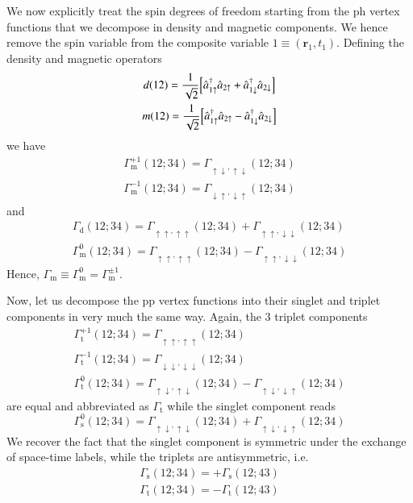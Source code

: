 \documentclass[aip,jcp,reprint,noshowkeys,superscriptaddress]{revtex4-1}
\newcommand{\cre}[1]{\Hat{a}_{#1}^{\dag}}
\newcommand{\ani}[1]{\Hat{a}_{#1}}
\newcommand{\br}{\boldsymbol{r}}
\newcommand{\up}{\uparrow}
\newcommand{\dw}{\downarrow}
\newcommand{\upup}{\up\up}
\newcommand{\updw}{\up\dw}
\newcommand{\dwup}{\dw\up}
\newcommand{\dwdw}{\dw\downarrow}
\begin{document}
We now explicitly treat the spin degrees of freedom starting from the ph vertex functions that we decompose in density and magnetic components.
We hence remove the spin variable from the composite variable $1 \equiv (\br_1,t_1)$.
Defining the density and magnetic operators
\begin{gather}
	d(12) = \frac{1}{\sqrt{2}} \qty[ \cre{1\up}\ani{2\up} + \cre{1\dw}\ani{2\dw} ]
	\\
	m(12) = \frac{1}{\sqrt{2}} \qty[ \cre{1\up}\ani{2\up} - \cre{1\dw}\ani{2\dw} ]
\end{gather}
we have
\begin{gather}
	\Gamma_\text{m}^{+1}(12;34) = \Gamma_{\updw,\updw}(12;34) 
	\\
	\Gamma_\text{m}^{-1}(12;34) = \Gamma_{\dwup,\dwup}(12;34)
\end{gather}
and
\begin{gather}
	\Gamma_\text{d}(12;34) = \Gamma_{\upup,\upup}(12;34) + \Gamma_{\upup,\dwdw}(12;34)
	\\
	\Gamma_\text{m}^{0}(12;34) = \Gamma_{\upup,\upup}(12;34) - \Gamma_{\upup,\dwdw}(12;34)
\end{gather}
Hence, $\Gamma_\text{m} \equiv \Gamma_\text{m}^{0} = \Gamma_\text{m}^{\pm1}$.

Now, let us decompose the pp vertex functions into their singlet and triplet components in very much the same way.
Again, the 3 triplet components
\begin{gather}
	\Gamma_\text{t}^{+1}(12;34) = \Gamma_{\upup,\upup}(12;34)
	\\
	\Gamma_\text{t}^{-1}(12;34) = \Gamma_{\dwdw,\dwdw}(12;34)
	\\
	\Gamma_\text{t}^{0}(12;34) = \Gamma_{\updw,\updw}(12;34) - \Gamma_{\updw,\dwup}(12;34)
\end{gather}
are equal and abbreviated as $\Gamma_\text{t}$ while the singlet component reads
\begin{equation}
	\Gamma_\text{s}^{0}(12;34) = \Gamma_{\updw,\updw}(12;34) + \Gamma_{\updw,\dwup}(12;34)
\end{equation}
We recover the fact that the singlet component is symmetric under the exchange of space-time labels, while the triplets are antisymmetric, i.e.
\begin{gather}
	\Gamma_\text{s}(12;34) = + \Gamma_\text{s}(12;43)
	\\
	\Gamma_\text{t}(12;34) = - \Gamma_\text{t}(12;43)
\end{gather}
\end{document}
